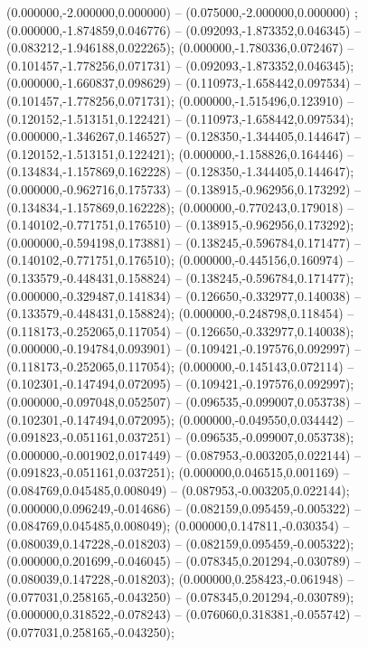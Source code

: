  (0.000000,-2.000000,0.000000) -- (0.075000,-2.000000,0.000000) ;
 (0.000000,-1.874859,0.046776) -- (0.092093,-1.873352,0.046345) -- (0.083212,-1.946188,0.022265);
 (0.000000,-1.780336,0.072467) -- (0.101457,-1.778256,0.071731) -- (0.092093,-1.873352,0.046345);
 (0.000000,-1.660837,0.098629) -- (0.110973,-1.658442,0.097534) -- (0.101457,-1.778256,0.071731);
 (0.000000,-1.515496,0.123910) -- (0.120152,-1.513151,0.122421) -- (0.110973,-1.658442,0.097534);
 (0.000000,-1.346267,0.146527) -- (0.128350,-1.344405,0.144647) -- (0.120152,-1.513151,0.122421);
 (0.000000,-1.158826,0.164446) -- (0.134834,-1.157869,0.162228) -- (0.128350,-1.344405,0.144647);
 (0.000000,-0.962716,0.175733) -- (0.138915,-0.962956,0.173292) -- (0.134834,-1.157869,0.162228);
 (0.000000,-0.770243,0.179018) -- (0.140102,-0.771751,0.176510) -- (0.138915,-0.962956,0.173292);
 (0.000000,-0.594198,0.173881) -- (0.138245,-0.596784,0.171477) -- (0.140102,-0.771751,0.176510);
 (0.000000,-0.445156,0.160974) -- (0.133579,-0.448431,0.158824) -- (0.138245,-0.596784,0.171477);
 (0.000000,-0.329487,0.141834) -- (0.126650,-0.332977,0.140038) -- (0.133579,-0.448431,0.158824);
 (0.000000,-0.248798,0.118454) -- (0.118173,-0.252065,0.117054) -- (0.126650,-0.332977,0.140038);
 (0.000000,-0.194784,0.093901) -- (0.109421,-0.197576,0.092997) -- (0.118173,-0.252065,0.117054);
 (0.000000,-0.145143,0.072114) -- (0.102301,-0.147494,0.072095) -- (0.109421,-0.197576,0.092997);
 (0.000000,-0.097048,0.052507) -- (0.096535,-0.099007,0.053738) -- (0.102301,-0.147494,0.072095);
 (0.000000,-0.049550,0.034442) -- (0.091823,-0.051161,0.037251) -- (0.096535,-0.099007,0.053738);
 (0.000000,-0.001902,0.017449) -- (0.087953,-0.003205,0.022144) -- (0.091823,-0.051161,0.037251);
 (0.000000,0.046515,0.001169) -- (0.084769,0.045485,0.008049) -- (0.087953,-0.003205,0.022144);
 (0.000000,0.096249,-0.014686) -- (0.082159,0.095459,-0.005322) -- (0.084769,0.045485,0.008049);
 (0.000000,0.147811,-0.030354) -- (0.080039,0.147228,-0.018203) -- (0.082159,0.095459,-0.005322);
 (0.000000,0.201699,-0.046045) -- (0.078345,0.201294,-0.030789) -- (0.080039,0.147228,-0.018203);
 (0.000000,0.258423,-0.061948) -- (0.077031,0.258165,-0.043250) -- (0.078345,0.201294,-0.030789);
 (0.000000,0.318522,-0.078243) -- (0.076060,0.318381,-0.055742) -- (0.077031,0.258165,-0.043250);
